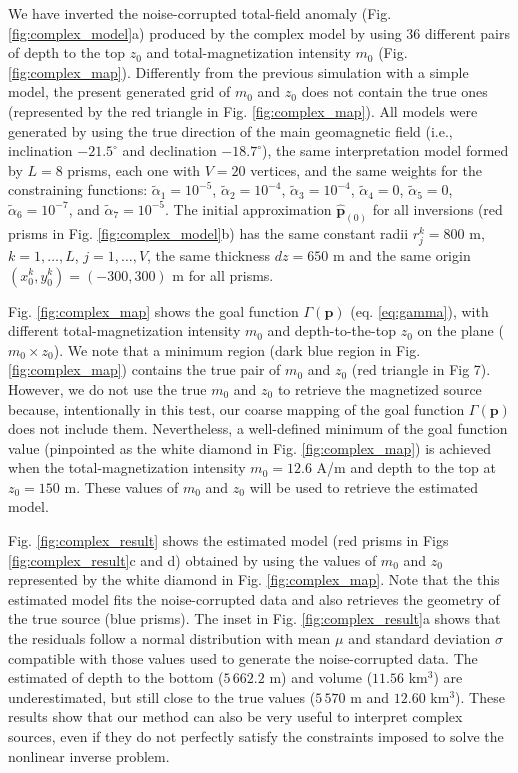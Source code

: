 We have inverted the noise-corrupted total-field anomaly (Fig. \ref{fig:complex_model}a) produced by the complex model by using 36 different pairs of depth to the top $ z_0 $ and total-magnetization intensity $ m_0 $ (Fig. \ref{fig:complex_map}). Differently from the previous simulation with a simple model, the present generated grid of $ m_0 $ and $ z_0 $ does not contain the true ones (represented by the red triangle in Fig. \ref{fig:complex_map}). All models were generated by using the true direction of the main geomagnetic field (i.e., inclination $ -21.5^\circ $ and declination $ -18.7^\circ $), the same interpretation model formed by $ L = 8 $ prisms, each one with $ V = 20 $ vertices, and the same weights for the constraining functions: $\tilde{\alpha}_1 = 10^{-5}$, $\tilde{\alpha}_2 = 10^{-4}$, $\tilde{\alpha}_3 = 10^{-4}$, $\tilde{\alpha}_4 = 0$, $\tilde{\alpha}_5 = 0$, $\tilde{\alpha}_6 = 10^{-7}$, and $\tilde{\alpha}_7 = 10^{-5}$. 
The initial approximation $ \hat{\mathbf{p}}_{(0)} $ for all inversions 
(red prisms in Fig. \ref{fig:complex_model}b) has the same constant radii 
$ r^k_j = 800 $ m, $ k = 1, \dots, L $, $ j = 1, \dots, V $, 
the same thickness $ dz = 650 $ m and the same origin 
$ (x^k_0, y^k_0) = (-300, 300) $ m for all prisms.

Fig. \ref{fig:complex_map} shows the goal function $ \Gamma(\mathbf{p}) $ (eq. \ref{eq:gamma}), with different total-magnetization intensity $ m_0 $ and depth-to-the-top $z_0$ on the plane ($ m_0 \times z_0 $). We note that a minimum region (dark blue region in Fig. \ref{fig:complex_map}) contains the true pair of $ m_0 $ and  $ z_0 $  (red triangle  in Fig 7). However, we do not use the true  $ m_0 $ and $ z_0 $ to retrieve the magnetized source because, intentionally in this test, our coarse mapping of the goal function $ \Gamma(\mathbf{p}) $ does not  include them.  Nevertheless, a well-defined minimum of the goal function value (pinpointed as the white diamond in Fig. \ref{fig:complex_map}) is achieved when the total-magnetization intensity $ m_0 = 12.6 $ A/m and depth to the top at $  z_0 = 150 $ m. These values of $ m_0 $ and $ z_0 $ will be used to retrieve the estimated model.

Fig. \ref{fig:complex_result} shows the estimated model (red prisms in Figs \ref{fig:complex_result}c and d) obtained by using the values of $ m_0 $ and $ z_0 $
represented by the white diamond in Fig. \ref{fig:complex_map}.
Note that the this estimated model fits the noise-corrupted data and also 
retrieves the geometry of the true source (blue prisms). 
The inset in Fig. \ref{fig:complex_result}a shows that the residuals follow a normal distribution with mean $ \mu $ and standard deviation $ \sigma $ compatible with those values used to generate the noise-corrupted data. 
The estimated of depth to the bottom  ($ 5\,662.2 $ m) and volume ($ 11.56 $ km$^3 $) are underestimated, but still close to the true values ($ 5\,570 $ m and $ 12.60 $ km$^3 $). 
These results show that our method can also be very useful to interpret complex sources, even if they do not perfectly satisfy the constraints imposed to solve the nonlinear inverse problem.